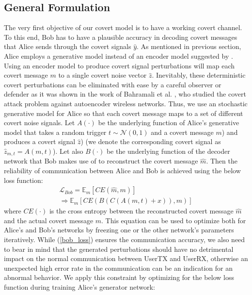 \subsection{General Formulation}
The very first objective of our covert model is to have a working covert channel. To this end, Bob has to have a plausible accuracy in decoding covert messages that Alice sends through the covert signals \(\hat{y}\). As mentioned in previous section, Alice employs a generative model instead of an encoder model suggested by \cite{mohammed2021adversarial}. Using an encoder model to produce covert signal perturbations will map each covert message \(m\) to a single covert noise vector \(\hat{z}\). Inevitably, these deterministic covert perturbations can be eliminated with ease by a careful observer or defender as it was shown in the work of Bahramali et al. \cite{bahramali2021robust}, who studied the covert attack problem against autoencoder wireless networks. Thus, we use an stochastic generative model for Alice so that each covert message maps to a set of different covert noise signals. Let \(A(\cdot)\) be the underlying function of Alice's generative model that takes a random trigger \(t \sim \mathcal{N}(0, 1)\) and a covert message \(m\)) and produces a covert signal \(\hat{z}\)) (we denote the corresponding covert signal as \(\hat{z}_{m, t} = A(m, t)\)). Let also  \(B(\cdot)\) be the underlying function of the decoder network that Bob makes use of to reconstruct the covert message \(\hat{m}\). Then the reliability of communication between Alice and Bob is achieved using the below loss function:
\begin{equation}
	\begin{array}{l} \label{bob_loss}
	\mathcal{L}_{Bob} = \mathbb{E}_{m}[CE(\hat{m}, m)] \\ \Rightarrow \mathbb{E}_{m}[CE(B(C(A(m, t) + x)), m)]
	\end{array}
\end{equation}
where \(CE(\cdot)\) is the cross entropy between the reconstructed covert message \(\hat{m}\) and the actual covert message \(m\). This equation can be used to optimize both for Alice's and Bob's networks by freezing one or the other network's parameters iteratively. While (\ref{bob_loss}) ensures the communication accuracy, we also need to bear in mind that the generated perturbations should have no detrimental impact on the normal communication between UserTX and UserRX, otherwise an unexpected high error rate in the communication can be an indication for an abnormal behavior. We apply this constraint by optimizing for the below loss function during training Alice's generator network:
